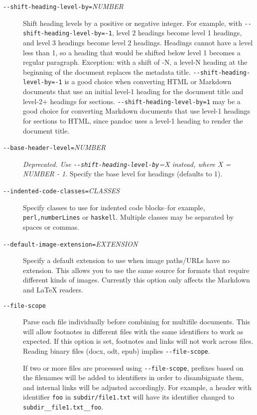\begin{description}
\item[\texttt{-\/-shift-heading-level-by=}\emph{NUMBER}]
Shift heading levels by a positive or negative integer. For example,
with \texttt{-\/-shift-heading-level-by=-1}, level 2 headings become
level 1 headings, and level 3 headings become level 2 headings. Headings
cannot have a level less than 1, so a heading that would be shifted
below level 1 becomes a regular paragraph. Exception: with a shift of
-N, a level-N heading at the beginning of the document replaces the
metadata title. \texttt{-\/-shift-heading-level-by=-1} is a good choice
when converting HTML or Markdown documents that use an initial level-1
heading for the document title and level-2+ headings for sections.
\texttt{-\/-shift-heading-level-by=1} may be a good choice for
converting Markdown documents that use level-1 headings for sections to
HTML, since pandoc uses a level-1 heading to render the document title.
\item[\texttt{-\/-base-header-level=}\emph{NUMBER}]
\emph{Deprecated. Use \texttt{-\/-shift-heading-level-by}=X instead,
where X = NUMBER - 1.} Specify the base level for headings (defaults to
1).
\item[\texttt{-\/-indented-code-classes=}\emph{CLASSES}]
Specify classes to use for indented code blocks--for example,
\texttt{perl,numberLines} or \texttt{haskell}. Multiple classes may be
separated by spaces or commas.
\item[\texttt{-\/-default-image-extension=}\emph{EXTENSION}]
Specify a default extension to use when image paths/URLs have no
extension. This allows you to use the same source for formats that
require different kinds of images. Currently this option only affects
the Markdown and LaTeX readers.
\item[\texttt{-\/-file-scope}]
Parse each file individually before combining for multifile documents.
This will allow footnotes in different files with the same identifiers
to work as expected. If this option is set, footnotes and links will not
work across files. Reading binary files (docx, odt, epub) implies
\texttt{-\/-file-scope}.

If two or more files are processed using \texttt{-\/-file-scope},
prefixes based on the filenames will be added to identifiers in order to
disambiguate them, and internal links will be adjusted accordingly. For
example, a header with identifier \texttt{foo} in
\texttt{subdir/file1.txt} will have its identifier changed to
\texttt{subdir\_\_file1.txt\_\_foo}.


\end{description}
